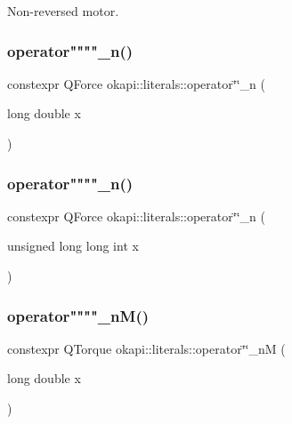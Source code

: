 Non-\/reversed motor. \mbox{\label{namespaceokapi_1_1literals_af29760df0e8f486842836e96f6eb073e}} 
\subsubsection{\texorpdfstring{operator""""\_n()}{operator""\_n()}\hspace{0.1cm}{\footnotesize\ttfamily [1/2]}}
{\footnotesize\ttfamily constexpr Q\+Force okapi\+::literals\+::operator\char`\"{}\char`\"{}\+\_\+n (\begin{DoxyParamCaption}\item[{long double}]{x }\end{DoxyParamCaption})}

\mbox{\label{namespaceokapi_1_1literals_a5b41173a8aa88f8f5734b49468a96fa8}} 
\subsubsection{\texorpdfstring{operator""""\_n()}{operator""\_n()}\hspace{0.1cm}{\footnotesize\ttfamily [2/2]}}
{\footnotesize\ttfamily constexpr Q\+Force okapi\+::literals\+::operator\char`\"{}\char`\"{}\+\_\+n (\begin{DoxyParamCaption}\item[{unsigned long long int}]{x }\end{DoxyParamCaption})}

\mbox{\label{namespaceokapi_1_1literals_ac65b950fcec6f63f51fb8aa139cd43ec}} 
\subsubsection{\texorpdfstring{operator""""\_nM()}{operator""\_nM()}\hspace{0.1cm}{\footnotesize\ttfamily [1/2]}}
{\footnotesize\ttfamily constexpr Q\+Torque okapi\+::literals\+::operator\char`\"{}\char`\"{}\+\_\+nM (\begin{DoxyParamCaption}\item[{long double}]{x }\end{DoxyParamCaption})}

